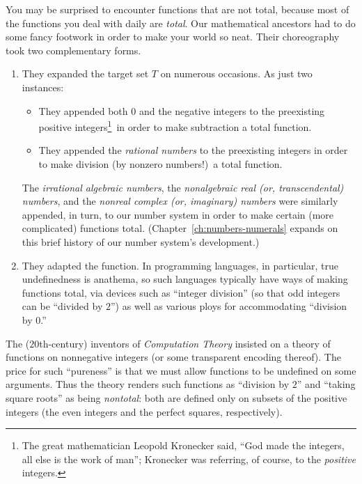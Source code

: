 You may be surprised to encounter functions that are not total,
because most of the functions you deal with daily are {\em total}.
Our mathematical ancestors had to do some fancy footwork in order to
make your world so neat.  Their choreography took two complementary
forms.
\begin{enumerate}
\item
They expanded the target set $T$ on numerous occasions.  As just two
instances:
  \begin{itemize}
  \item
They appended both $0$ and the negative integers to the preexisting
positive integers\footnote{The great mathematician Leopold Kronecker
  said, ``God made the integers, all else is the work of man'';
  Kronecker was referring, of course, to the {\em positive}
  integers.}~in order to make subtraction a total function.

  \item
They appended the {\it rational numbers} to the preexisting integers
in order to make division (by nonzero numbers!)~a total function.
  \end{itemize}
The {\it irrational algebraic numbers}, the {\it nonalgebraic real
  (or, transcendental) numbers}, and the {\it nonreal complex (or,
  imaginary) numbers} were similarly appended, in turn, to our number
system in order to make certain (more complicated) functions total.
(Chapter~\ref{ch:numbers-numerals} expands on this brief history of
our number system's development.)

\item
They adapted the function.  In programming languages, in particular,
true undefinedness is anathema, so such languages typically have ways
of making functions total, via devices such as ``integer division''
(so that odd integers can be ``divided by $2$'') as well as various
ploys for accommodating ``division by $0$.''
\end{enumerate}
The ($20$th-century) inventors of {\em Computation Theory} insisted on
a theory of functions on nonnegative integers (or some transparent
encoding thereof).  The price for such ``pureness'' is that we must
allow functions to be undefined on some arguments.  Thus the theory
renders such functions as ``division by $2$'' and ``taking square
roots'' as being {\em nontotal}: both are defined only on subsets of
the positive integers (the even integers and the perfect squares,
respectively).

